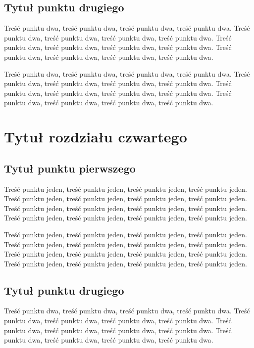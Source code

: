 \documentclass[brudnopis,xodstep]{wkmgr}
\begin{document}
\section{Tytuł punktu drugiego \label{sec:cpr-lic}}

Treść punktu dwa, treść punktu dwa, treść punktu dwa, treść punktu dwa.
Treść punktu dwa, treść punktu dwa, treść punktu dwa, treść punktu dwa.
Treść punktu dwa, treść punktu dwa, treść punktu dwa, treść punktu dwa.
Treść punktu dwa, treść punktu dwa, treść punktu dwa, treść punktu dwa.

Treść punktu dwa, treść punktu dwa, treść punktu dwa, treść punktu dwa.
Treść punktu dwa, treść punktu dwa, treść punktu dwa, treść punktu dwa.
Treść punktu dwa, treść punktu dwa, treść punktu dwa, treść punktu dwa.
Treść punktu dwa, treść punktu dwa, treść punktu dwa, treść punktu dwa.

\chapter{Tytuł rozdziału czwartego}

\section{Tytuł punktu pierwszego}

Treść punktu jeden, treść punktu jeden, treść punktu jeden, treść punktu jeden.
Treść punktu jeden, treść punktu jeden, treść punktu jeden, treść punktu jeden.
Treść punktu jeden, treść punktu jeden, treść punktu jeden, treść punktu jeden.
Treść punktu jeden, treść punktu jeden, treść punktu jeden, treść punktu jeden.

Treść punktu jeden, treść punktu jeden, treść punktu jeden, treść punktu jeden.
Treść punktu jeden, treść punktu jeden, treść punktu jeden, treść punktu jeden.
Treść punktu jeden, treść punktu jeden, treść punktu jeden, treść punktu jeden.
Treść punktu jeden, treść punktu jeden, treść punktu jeden, treść punktu jeden.

\section{Tytuł punktu drugiego}

Treść punktu dwa, treść punktu dwa, treść punktu dwa, treść punktu dwa.
Treść punktu dwa, treść punktu dwa, treść punktu dwa, treść punktu dwa.
Treść punktu dwa, treść punktu dwa, treść punktu dwa, treść punktu dwa.
Treść punktu dwa, treść punktu dwa, treść punktu dwa, treść punktu dwa.
\end{document}
